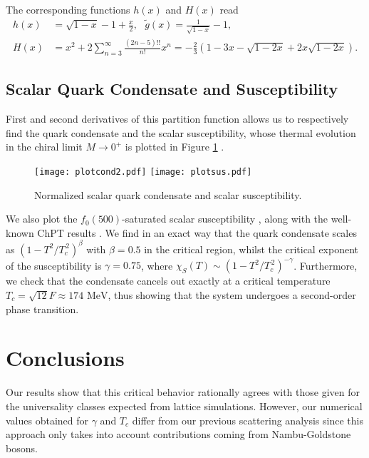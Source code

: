 \documentclass{PoS}
\begin{document}
The corresponding functions $h(x)$ and $H(x)$ read
\begin{align}
 h(x)&=\sqrt{1-x}-1+\frac{x}{2},\text{ }\tilde g(x)=\frac{1}{\sqrt{1-x}}-1, \\
 H(x)&=x^2+2\sum_{n=3}^\infty  \frac{(2n-5)!!}{n!} x^n=-\frac{2}{3}\left(1-3x-\sqrt{1-2x}+2x\sqrt{1-2x}\right). 
\end{align}


\subsection{Scalar Quark Condensate and Susceptibility}

First and second derivatives of this partition function allows us to respectively find the quark condensate and the scalar susceptibility, whose thermal evolution in the chiral limit $M\rightarrow 0^{+}$ is plotted in Figure \ref{fig:scalarcond} \cite{Cortes:2016ecy}.

\begin{figure}
\begin{center}
\centerline{\texttt{[image: plotcond2.pdf]} \texttt{[image: plotsus.pdf]}}
\end{center}
\caption{Normalized scalar quark condensate and scalar susceptibility.}
\label{fig:scalarcond}
\end{figure}


We also plot the $f_{0}(500)$-saturated scalar susceptibility \cite{Cortes:2015emo}, along with the well-known ChPT results \cite{Gerber:1988tt}. We find in an exact way that the quark condensate scales as $(1-T^{2}/T_{c}^{\,2})^{\beta}$ with $\beta=\text{0.5}$ in the critical region, whilst the critical exponent of the susceptibility is $\gamma=\text{0.75}$, where $\chi_{S}(T)\sim (1-T^{2}/T_{c}^{\,2})^{-\gamma}$. Furthermore, we check that the condensate cancels out exactly at a critical temperature $T_{c}=\sqrt{12}F\approx\text{174 MeV}$, thus showing that the system undergoes a second-order phase transition. 

\section{Conclusions} 

Our results show that this critical behavior rationally agrees with those given for the universality classes expected from lattice simulations. However, our numerical values obtained for $\gamma$ and $T_{c}$ differ from our previous scattering analysis since this approach only takes into account contributions coming from Nambu-Goldstone bosons.
\end{document}
